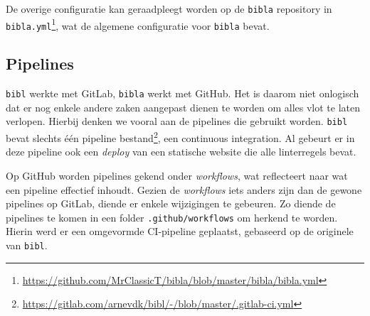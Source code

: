 De overige configuratie kan geraadpleegt worden op de \texttt{bibla} repository in \texttt{bibla.yml}\footnote{\url{https://github.com/MrClassicT/bibla/blob/master/bibla/bibla.yml}}, wat de algemene configuratie voor \texttt{bibla} bevat.

\subsection{Pipelines}
\texttt{bibl} werkte met GitLab, \texttt{bibla} werkt met GitHub. Het is daarom niet onlogisch dat er nog enkele andere zaken aangepast dienen te worden om alles vlot te laten verlopen. Hierbij denken we vooral aan de pipelines die gebruikt worden. \texttt{bibl} bevat slechts één pipeline bestand\footnote{\url{https://gitlab.com/arnevdk/bibl/-/blob/master/.gitlab-ci.yml}}, een continuous integration. Al gebeurt er in deze pipeline ook een \emph{deploy} van een statische website die alle linterregels bevat.

Op GitHub worden pipelines gekend onder \emph{workflows}, wat reflecteert naar wat een pipeline effectief inhoudt. Gezien de \emph{workflows} iets anders zijn dan de gewone pipelines op GitLab, diende er enkele wijzigingen te gebeuren. Zo diende de pipelines te komen in een folder \texttt{.github/workflows} om herkend te worden. Hierin werd er een omgevormde CI-pipeline geplaatst, gebaseerd op de originele van \texttt{bibl}.


